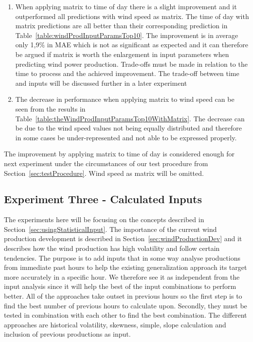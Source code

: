 \begin{enumerate}
\item When applying matrix to time of day there is a slight improvement and it outperformed all predictions with wind speed as matrix. The time of day with matrix predictions are all better than their corresponding prediction in Table~\ref{table:windProdInputParamsTop10}. The improvement is in average only 1,9\% in MAE which is not as significant as expected and it can therefore be argued if matrix is worth the enlargement in input parameters when predicting wind power production. Trade-offs must be made in relation to the time to process and the achieved improvement. The trade-off between time and inputs will be discussed further in a later experiment 
\item The decrease in performance when applying matrix to wind speed can be seen from the results in Table~\ref{table:theWindProdInputParamsTop10WithMatrix}. The decrease can be due to the wind speed values not being equally distributed and therefore in some cases be under-represented and not able to be expressed properly.  
\end{enumerate}

The improvement by applying matrix to time of day is considered enough for next experiment under the circumstances of our test procedure from Section~\ref{sec:testProcedure}. Wind speed as matrix will be omitted.

\newpage

\subsection{Experiment Three - Calculated Inputs}
The experiments here will be focusing on the concepts described in Section~\ref{sec:usingStatisticalInput}. The importance of the current wind production development is described in Section~\ref{sec:windProductionDev} and it describes how the wind production has high volatility and follow certain tendencies. The purpose is to add inputs that in some way analyse productions from immediate past hours to help the existing generalization approach its target more accurately in a specific hour. We therefore see it as independent from the input analysis since it will help the best of the input combinations to perform better. All of the approaches take outset in previous hours so the first step is to find the best number of previous hours to calculate upon. Secondly, they must be tested in combination with each other to find the best combination. The different approaches are historical volatility, skewness, simple, slope calculation and inclusion of previous productions as input. 

